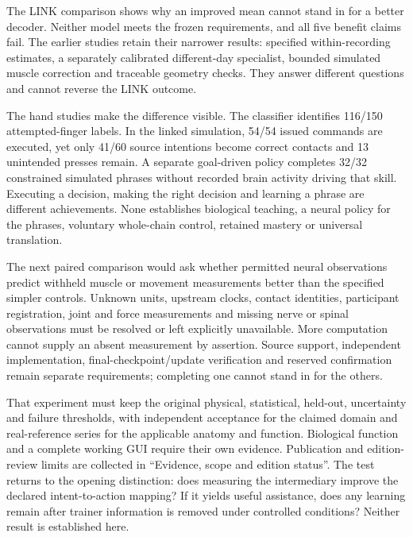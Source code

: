 The LINK comparison shows why an improved mean cannot stand in for a better decoder. Neither model meets the frozen requirements, and all five benefit claims fail. The earlier studies retain their narrower results: specified within-recording estimates, a separately calibrated different-day specialist, bounded simulated muscle correction and traceable geometry checks. They answer different questions and cannot reverse the LINK outcome.

The hand studies make the difference visible. The classifier identifies 116/150 attempted-finger labels. In the linked simulation, 54/54 issued commands are executed, yet only 41/60 source intentions become correct contacts and 13 unintended presses remain. A separate goal-driven policy completes 32/32 constrained simulated phrases without recorded brain activity driving that skill. Executing a decision, making the right decision and learning a phrase are different achievements. None establishes biological teaching, a neural policy for the phrases, voluntary whole-chain control, retained mastery or universal translation.

The next paired comparison would ask whether permitted neural observations predict withheld muscle or movement measurements better than the specified simpler controls. Unknown units, upstream clocks, contact identities, participant registration, joint and force measurements and missing nerve or spinal observations must be resolved or left explicitly unavailable. More computation cannot supply an absent measurement by assertion. Source support, independent implementation, final-checkpoint/update verification and reserved confirmation remain separate requirements; completing one cannot stand in for the others.

That experiment must keep the original physical, statistical, held-out, uncertainty and failure thresholds, with independent acceptance for the claimed domain and real-reference series for the applicable anatomy and function. Biological function and a complete working GUI require their own evidence. Publication and edition-review limits are collected in ``Evidence, scope and edition status''. The test returns to the opening distinction: does measuring the intermediary improve the declared intent-to-action mapping? If it yields useful assistance, does any learning remain after trainer information is removed under controlled conditions? Neither result is established here.

